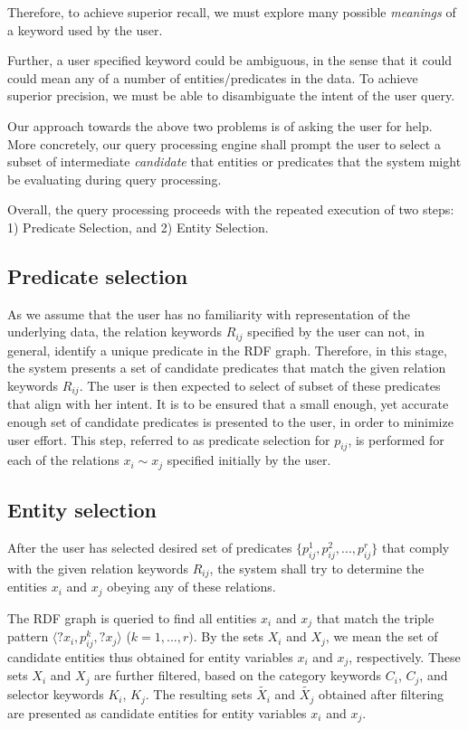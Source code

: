 \documentclass[a4paper, twoside, 12pt]{report}
\begin{document}
Therefore, to achieve superior recall, we must explore many possible \emph{meanings} of a keyword used by the user. 

Further, a user specified keyword could be ambiguous, in the sense that it could could mean any of a number of entities/predicates in the data. To achieve superior precision, we must be able to disambiguate the intent of the user query. 

Our approach towards the above two problems is of asking the user for help. More concretely, our query processing engine shall prompt the user to select a subset of intermediate \emph{candidate} that entities or predicates that the system might be evaluating during query processing. 

Overall, the query processing proceeds with the repeated execution of two steps: 1) Predicate Selection, and 2) Entity Selection.

\subsection{Predicate selection} \label{predsel}

As we assume that the user has no familiarity with representation of the underlying data, the relation keywords $R_{ij}$ specified by the user can not, in general, identify a unique predicate in the RDF graph. Therefore, in this stage, the system presents a set of candidate predicates that match the given relation keywords $R_{ij}$. The user is then expected to select of subset of these predicates that align with her intent. It is to be ensured that a small enough, yet accurate enough set of candidate predicates is presented to the user, in order to minimize user effort. This step, referred to as predicate selection for $p_{ij}$, is performed for each of the relations $x_i \sim x_j$ specified initially by the user.

\subsection{Entity selection}

After the user has selected desired set of predicates $\{p^1_{ij}, p^2_{ij}, ..., p^r_{ij}\}$ that comply with the given relation keywords $R_{ij}$, the system shall try to determine the entities $x_i$ and $x_j$ obeying any of these relations.

The RDF graph is queried to find all entities $x_i$ and $x_j$ that match the triple pattern $\langle ?x_i, p^k_{ij}, ?x_j \rangle$ ($k = 1,...,r)$. By the sets $X_i$ and $X_j$, we mean the set of candidate entities thus obtained for entity variables $x_i$ and $x_j$, respectively. These sets $X_i$ and $X_j$ are further filtered, based on the category keywords $C_i$, $C_j$, and selector keywords $K_i$, $K_j$. The resulting sets $\tilde{X_i}$ and $\tilde{X_j}$ obtained after filtering are presented as candidate entities for entity variables $x_i$ and $x_j$.
\end{document}
